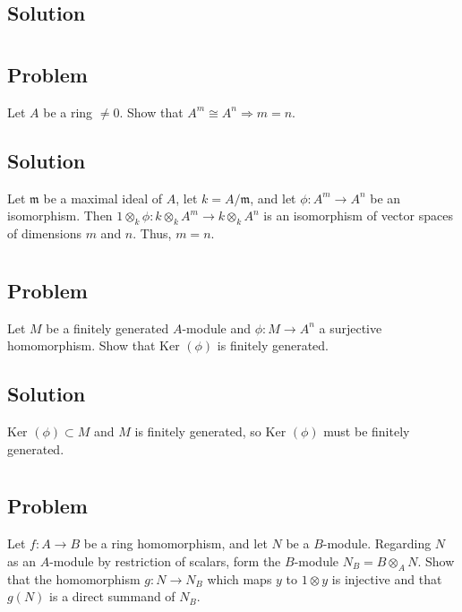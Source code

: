 \documentclass[book,12pt,oneside,openany]{memoir}
\begin{document}
\subsection{Solution}

\section{}
\subsection{Problem}
Let $A$ be a ring $\neq 0$. Show that $A^m \cong A^n \Rightarrow m = n$.

\subsection{Solution}
Let $\mathfrak{m}$ be a maximal ideal of $A$, let $k = A/\mathfrak{m}$, and let $\phi: A^m \rightarrow A^n$ be an isomorphism. Then $1 \otimes_k \phi: k \otimes_k A^m \rightarrow k \otimes_k A^n$ is an isomorphism of vector spaces of dimensions $m$ and $n$. Thus, $m = n$.

\section{}
\subsection{Problem}
Let $M$ be a finitely generated $A$-module and $\phi: M \rightarrow A^n$ a surjective homomorphism. Show that Ker $(\phi)$ is finitely generated.

\subsection{Solution}
Ker $(\phi) \subset M$ and $M$ is finitely generated, so Ker $(\phi)$ must be finitely generated.

\section{}
\subsection{Problem}
Let $f: A \rightarrow B$ be a ring homomorphism, and let $N$ be a $B$-module. Regarding $N$ as an $A$-module by restriction of scalars, form the $B$-module $N_B = B \otimes_A N$. Show that the homomorphism $g: N \rightarrow N_B$ which maps $y$ to $1 \otimes y$ is injective and that $g(N)$ is a direct summand of $N_B$.
\end{document}
